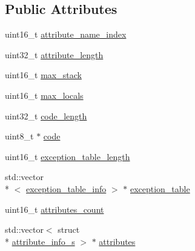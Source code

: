 \subsection*{Public Attributes}
\begin{DoxyCompactItemize}
\item 
uint16\+\_\+t \hyperlink{structCode__attribute__s_a2ad36c662b25c88553dffda3499b304a}{attribute\+\_\+name\+\_\+index}
\item 
uint32\+\_\+t \hyperlink{structCode__attribute__s_a83fe4677e5b3b8a9fb6460b064148ac3}{attribute\+\_\+length}
\item 
uint16\+\_\+t \hyperlink{structCode__attribute__s_a9f7cd4c713b350f6630949c6364e8e48}{max\+\_\+stack}
\item 
uint16\+\_\+t \hyperlink{structCode__attribute__s_a1c9257d634d9e8473acf1a3d13fac4e7}{max\+\_\+locals}
\item 
uint32\+\_\+t \hyperlink{structCode__attribute__s_ad5cdbcaf02efd1ac9d75d1d1d73d7523}{code\+\_\+length}
\item 
uint8\+\_\+t $\ast$ \hyperlink{structCode__attribute__s_aa8912d50bfd6b1b9bc24cfbb27d33736}{code}
\item 
uint16\+\_\+t \hyperlink{structCode__attribute__s_a73c51a112c0f08db03fe7622279b01e5}{exception\+\_\+table\+\_\+length}
\item 
std\+::vector\\*
$<$ \hyperlink{classexception__table__info}{exception\+\_\+table\+\_\+info} $>$ $\ast$ \hyperlink{structCode__attribute__s_a64c20d58846e4b1af5c4de2a750e8fde}{exception\+\_\+table}
\item 
uint16\+\_\+t \hyperlink{structCode__attribute__s_a12d5860b06a8484744852c38cb79144e}{attributes\+\_\+count}
\item 
std\+::vector$<$ struct \\*
\hyperlink{structattribute__info__s}{attribute\+\_\+info\+\_\+s} $>$ $\ast$ \hyperlink{structCode__attribute__s_a04152c5c6f9f1067d6e144e1e3a814fe}{attributes}
\end{DoxyCompactItemize}


